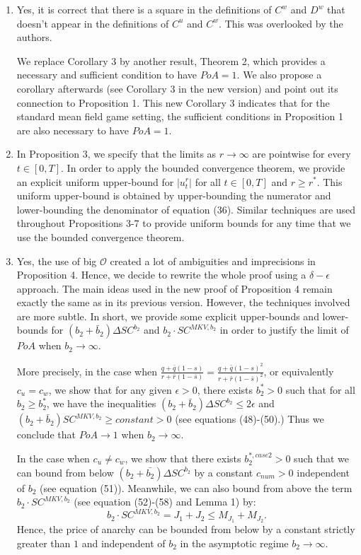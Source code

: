 \documentclass[11pt]{article}
\begin{document}
\begin{enumerate}
	\item Yes, it is correct that there is a square in the definitions of $C^w$ and $D^w$ that doesn't appear in the definitions of $C^u$ and $C^w$. This was overlooked by the authors.
	
	We replace Corollary 3 by another result, Theorem 2, which provides a necessary and sufficient condition to have $PoA = 1$. We also propose a corollary afterwards (see Corollary 3 in the new version) and point out its connection to Proposition 1. This new Corollary 3 indicates that for the standard mean field game setting, the sufficient conditions in Proposition 1 are also necessary to have $PoA=1$.
		
	
	\item In Proposition 3, we specify that the limits as $r \to \infty$ are pointwise for every $t \in [0,T]$. In order to apply the bounded convergence theorem, we provide an explicit uniform upper-bound for $\vert u_t^{r} \vert $ for all $t\in[0,T]$ and $r\geq r^*$. This uniform upper-bound is obtained by upper-bounding the numerator and lower-bounding the denominator of equation (36). Similar techniques are used throughout Propositions 3-7 to provide uniform bounds for any time that we use the bounded convergence theorem.
	
	\item Yes, the use of big $\mathcal{O}$ created a lot of ambiguities and imprecisions in Proposition 4. Hence, we decide to rewrite the whole proof using a $\delta-\epsilon$ approach. The main ideas used in the new proof of Proposition 4 remain exactly the same as in its previous version. However, the techniques involved are more subtle. In short, we provide some explicit upper-bounds and lower-bounds for $(b_2 + \bar{b}_2) \Delta SC^{b_2}$ and $b_2 \cdot SC^{MKV,b_2}$ in order to justify the limit of $PoA$ when $b_2 \to \infty$.
	
	More precisely, in the case when $\frac{q + \bar{q}(1-s)}{r + \bar{r}(1-\bar{s}) } = \frac{q + \bar{q}(1-s)^2}{r + \bar{r}(1-\bar{s})^2}$, or equivalently $c_u = c_w$, we show that for any given $\epsilon > 0$, there exists $b_2^*>0$ such that for all $b_2 \geq b_2^{*}$, we have the inequalities $(b_2 + \bar{b}_2) \Delta SC^{b_2} \leq 2\epsilon$ and 
	$(b_2 + \bar{b}_2) SC^{MKV,b_2} \geq constant > 0$ (see equations (48)-(50).) Thus we conclude that $PoA \to 1$ when $b_2 \to \infty$.
		
	In the case when $c_u \neq c_w$, we show that there exists $b_2^{*,case2}>0$ such that we can bound from below $(b_2 + \bar{b_2}) \Delta SC^{b_2}$ by a constant $c_{num}>0$ independent of $b_2$ (see equation (51)). Meanwhile, we can also bound from above the term $b_2 \cdot SC^{MKV,b_2}$ (see equation (52)-(58) and Lemma 1) by: 
	$$ b_2 \cdot SC^{MKV,b_2} = J_1 + J_2 \leq M_{J_1} + M_{J_2}.$$
	Hence, the price of anarchy can be bounded from below by a constant strictly greater than $1$ and independent of $b_2$ in the asymptotic regime $b_2 \to \infty$.	
	 

\end{enumerate}
\end{document}
